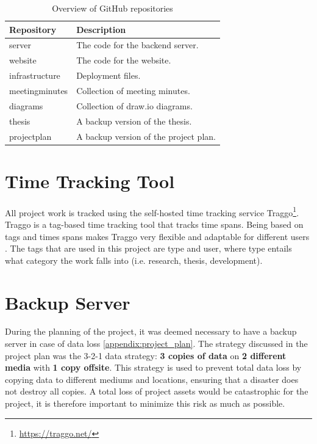 \begin{table}[h]
    \centering
    \begin{tabular}{l|l}
        \hline
        \textbf{Repository} & \textbf{Description} \\
        \hline
        server & The code for the backend server. \\
        website & The code for the website. \\
        \hline
        infrastructure & Deployment files. \\ 
        meetingminutes & Collection of meeting minutes. \\
        diagrams & Collection of draw.io\tablefootnote{\url{https://www.drawio.com/}} diagrams. \\
        \hline
        thesis & A backup version of the thesis. \\
        projectplan & A backup version of the project plan. \\
        \hline
    \end{tabular}
    \caption[Overview of GitHub repositories]{Overview of GitHub repositories}
    \label{tab:githubrepositories}
\end{table}

\section{Time Tracking Tool}

All project work is tracked using the self-hosted time tracking service Traggo\footnote{\url{https://traggo.net/}}. Traggo is a tag-based time tracking tool that tracks time spans. Being based on tags and times spans makes Traggo very flexible and adaptable for different users \cite{traggonet}. The tags that are used in this project are type and user, where type entails what category the work falls into (i.e. research, thesis, development).

\section{Backup Server}\label{sec:devpro:backupserver}

During the planning of the project, it was deemed necessary to have a backup server in case of data loss \autoref{appendix:project_plan}. The strategy discussed in the project plan was the 3-2-1 data strategy: \textbf{3 copies of data} on \textbf{2 different media} with \textbf{1 copy offsite}. This strategy is used to prevent total data loss by copying data to different mediums and locations, ensuring that a disaster does not destroy all copies. A total loss of project assets would be catastrophic for the project, it is therefore important to minimize this risk as much as possible.

